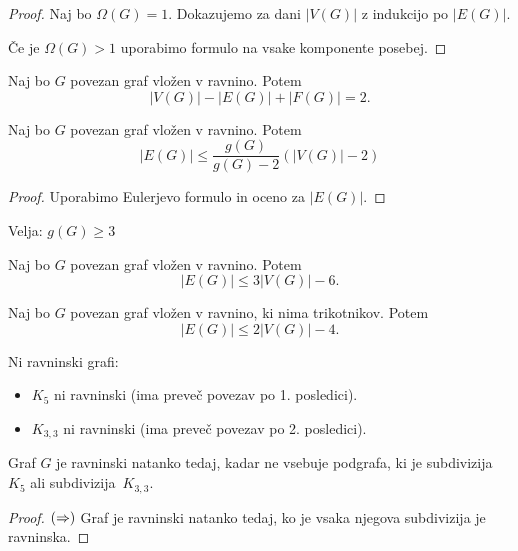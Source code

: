 \begin{proof}
    Naj bo $\Omega(G) = 1$. Dokazujemo za dani $|V(G)|$ z indukcijo po $|E(G)|$.

    Če je $\Omega(G) > 1$ uporabimo formulo na vsake komponente posebej.
\end{proof}

\begin{posledica}
    Naj bo $G$ povezan graf vložen v ravnino. Potem $$|V(G)| - |E(G)|+|F(G)| = 2.$$
\end{posledica}

\begin{trditev}
    Naj bo $G$ povezan graf vložen v ravnino. Potem
    $$|E(G)| \leq \frac{g(G)}{g(G)-2}(|V(G)| - 2)$$
\end{trditev}

\begin{proof}
    Uporabimo Eulerjevo formulo in oceno za $|E(G)|$.
\end{proof}

\begin{opomba}
    Velja: $g(G) \geq 3$
\end{opomba}

\begin{posledica}
    Naj bo $G$ povezan graf vložen v ravnino. Potem $$|E(G)| \leq 3|V(G)| - 6.$$
\end{posledica}

\begin{posledica}
     Naj bo $G$ povezan graf vložen v ravnino, ki nima trikotnikov. Potem $$|E(G)| \leq 2|V(G)| - 4.$$
\end{posledica}

\begin{primer}
    Ni ravninski grafi:
    \begin{itemize}
        \item $K_5$ ni ravninski (ima preveč povezav po 1. posledici).
        \item $K_{3,3}$ ni ravninski (ima preveč povezav po 2. posledici).
    \end{itemize}
\end{primer}

\begin{izrek}[Kuratowski]
    Graf $G$ je ravninski natanko tedaj, kadar ne vsebuje podgrafa, ki je subdivizija $K_5$ ali subdivizija~$K_{3,3}$.
\end{izrek}

\begin{proof}
    $(\Rightarrow)$ Graf je ravninski natanko tedaj, ko je vsaka njegova subdivizija je ravninska.
\end{proof}

